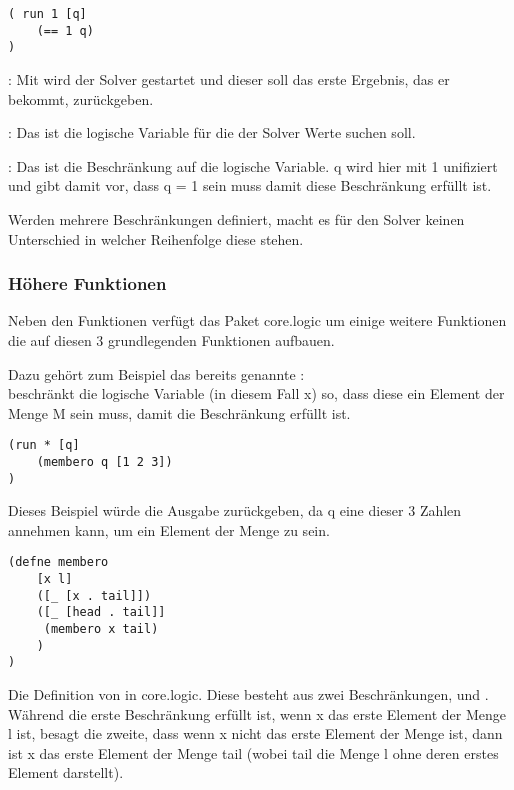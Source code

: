 \begin{lstlisting}
( run 1 [q] 
	(== 1 q)
)
\end{lstlisting}
\begin{description}
\item{:}
Mit  wird der Solver gestartet und dieser soll das erste Ergebnis, das er bekommt, zurückgeben.
\item{\code{[q]}:}
Das ist die logische Variable für die der Solver Werte suchen soll.
\item{:}
Das ist die Beschränkung auf die logische Variable. q wird hier mit 1 unifiziert und gibt damit vor, dass q = 1 sein muss damit diese Beschränkung erfüllt ist.
\end{description}
Werden mehrere Beschränkungen definiert, macht es für den Solver keinen Unterschied in welcher Reihenfolge diese stehen. 

\subsubsection{Höhere Funktionen}

Neben den Funktionen  verfügt das Paket core.logic um einige weitere Funktionen die auf diesen 3 grundlegenden Funktionen aufbauen.

Dazu gehört zum Beispiel das bereits genannte :\\
 beschränkt die logische Variable (in diesem Fall x) so, dass diese ein Element der Menge M sein muss, damit die Beschränkung erfüllt ist.\\
\begin{lstlisting}
(run * [q]
	(membero q [1 2 3])
)
\end{lstlisting}
Dieses Beispiel würde die Ausgabe  zurückgeben, da q eine dieser 3 Zahlen annehmen kann, um ein Element der Menge \code{[1 2 3]} zu sein.

\begin{lstlisting}
(defne membero
	[x l]
	([_ [x . tail]])
	([_ [head . tail]]
	 (membero x tail)
	)
)
\end{lstlisting}
Die Definition von  in core.logic. Diese besteht aus zwei Beschränkungen, \code{([\_ [x . tail]])} und . Während die erste Beschränkung erfüllt ist, wenn x das erste Element der Menge l ist, besagt die zweite, dass wenn x nicht das erste Element der Menge ist, dann ist x das erste Element der Menge tail (wobei tail die Menge l ohne deren erstes Element darstellt).

